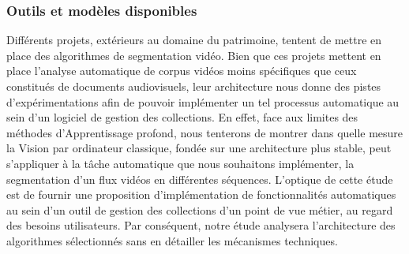 




\subsubsection{Outils et modèles disponibles}


Différents projets, extérieurs au domaine du patrimoine, tentent de mettre en place des algorithmes de segmentation vidéo. Bien que ces projets mettent en place l'analyse automatique de corpus vidéos moins spécifiques que ceux constitués de documents audiovisuels, leur architecture nous donne des pistes d'expérimentations afin de pouvoir implémenter un tel processus automatique au sein d'un logiciel de gestion des collections. En effet, face aux limites des méthodes d'\gls{Apprentissage profond}, nous tenterons de montrer dans quelle mesure la \gls{Vision par ordinateur} classique, fondée sur une architecture plus stable, peut s'appliquer à la tâche automatique que nous souhaitons implémenter, la segmentation d'un flux vidéos en différentes séquences. L'optique de cette étude est de fournir une proposition d'implémentation de fonctionnalités automatiques au sein d'un outil de gestion des collections d'un point de vue métier, au regard des besoins utilisateurs. Par conséquent, notre étude analysera l'architecture des algorithmes sélectionnés sans en détailler les mécanismes techniques.  

